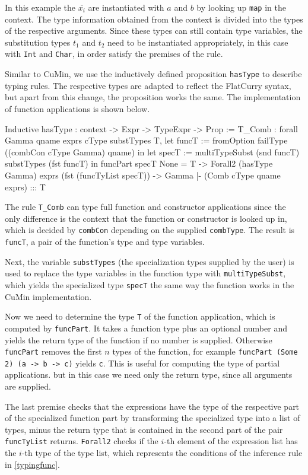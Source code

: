 \documentclass[paper = a4, fleqn, twoside]{scrreprt}
\newcommand{\coqinline}[1]{\texttt{#1}}
\begin{document}
In this example the $\overline{x_i}$ are instantiated with $a$ and $b$ by looking up \texttt{map} in the context. The type information obtained from the context is divided into the types of the respective arguments. Since these types can still contain type variables, the substitution types $t_1$ and $t_2$ need to be instantiated appropriately, in this case with \texttt{Int} and \texttt{Char}, in order satisfy the premises of the rule.\\
\par \noindent
Similar to CuMin, we use the inductively defined proposition \texttt{hasType} to describe typing rules. The respective types are adapted to reflect the FlatCurry syntax, but apart from this change, the proposition works the same. The implementation of function applications is shown below.
\begin{coqcode}
Inductive hasType : context -> Expr -> TypeExpr -> Prop :=
T_Comb : forall Gamma qname exprs cType substTypes T,
           let funcT := fromOption failType ((combCon cType Gamma) qname) in
           let specT := multiTypeSubst (snd funcT) substTypes (fst funcT)
            in funcPart specT None = T ->
               Forall2 (hasType Gamma) exprs (fst (funcTyList specT)) ->
           Gamma |- (Comb cType qname exprs) ::: T
\end{coqcode}
The rule \texttt{T\_Comb} can type full function and constructor applications since the only difference is the context that the function or constructor is looked up in, which is decided by \texttt{combCon} depending on the supplied \texttt{combType}. The result is \texttt{funcT}, a pair of the function's type and type variables. 
\par
Next, the variable \texttt{substTypes} (the specialization types supplied by the user) is used to replace the type variables in the function type with \texttt{multiTypeSubst}, which yields the specialized type \coqinline{specT} the same way the function works in the CuMin implementation.
\par
Now we need to determine the type \texttt{T} of the function application, which is computed by \coqinline{funcPart}. It takes a function type plus an optional number and yields the return type of the function if no number is supplied. Otherwise \coqinline{funcPart} removes the first $n$ types of the function, for example \texttt{funcPart (Some 2) (a -> b -> c)} yields \texttt{c}. This is useful for computing the type of partial applications. but in this case we need only the return type, since all arguments are supplied.
\par
The last premise checks that the expressions have the type of the respective part of the specialized function part by transforming the specialized type into a list of types, minus the return type that is contained in the second part of the pair \texttt{funcTyList} returns. \coqinline{Forall2} checks if the $i$-th element of the expression list has the $i$-th type of the type list, which represents the conditions of the inference rule in \autoref{typingfunc}.
\end{document}
